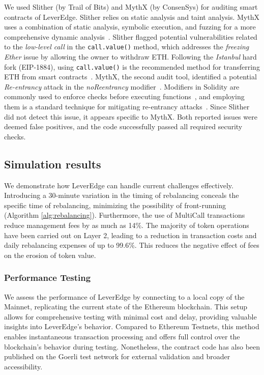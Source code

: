 We used Slither (by Trail of Bits) and MythX (by ConsenSys) for auditing smart contracts of LeverEdge. Slither relies on static analysis and taint analysis. MythX uses a combination of static analysis, symbolic execution, and fuzzing for a more comprehensive dynamic analysis~\cite{Slither_Doc,SlitherSetup,MythX_Doc}. Slither flagged potential vulnerabilities related to the \textit{low-level call} in the \texttt{call.value()} method, which addresses the \textit{freezing Ether} issue by allowing the owner to withdraw ETH. Following the \textit{Istanbul} hard fork (EIP-1884), using \texttt{call.value()} is the recommended method for transferring ETH from smart contracts~\cite{EIP-1884}. MythX, the second audit tool, identified a potential \textit{Re-entrancy} attack in the \textit{noReentrancy} modifier~\cite{Reentrancy}. Modifiers in Solidity are commonly used to enforce checks before executing functions~\cite{SolidityModifer}, and employing them is a standard technique for mitigating re-entrancy attacks~\cite{ReentrancyGuard}. Since Slither did not detect this issue, it appears specific to MythX. Both reported issues were deemed false positives, and the code successfully passed all required security checks.

\subsection{Simulation results}
We demonstrate how LeverEdge can handle current challenges effectively. Introducing a 30-minute variation in the timing of rebalancing conceals the specific time of rebalancing, minimizing the possibility of front-running (Algorithm \ref{alg:rebalancing}). Furthermore, the use of MultiCall transactions reduce management fees by as much as 14\%. The majority of token operations have been carried out on Layer 2, leading to a reduction in transaction costs and daily rebalancing expenses of up to 99.6\%. This reduces the negative effect of fees on the erosion of token value.

\subsubsection{Performance Testing}\label{appx:testing}
We assess the performance of LeverEdge by connecting to a local copy of the Mainnet, replicating the current state of the Ethereum blockchain. This setup allows for comprehensive testing with minimal cost and delay, providing valuable insights into LeverEdge's behavior. Compared to Ethereum Testnets, this method enables instantaneous transaction processing and offers full control over the blockchain’s behavior during testing. Nonetheless, the contract code has also been published on the Goerli test network for external validation and broader accessibility.

